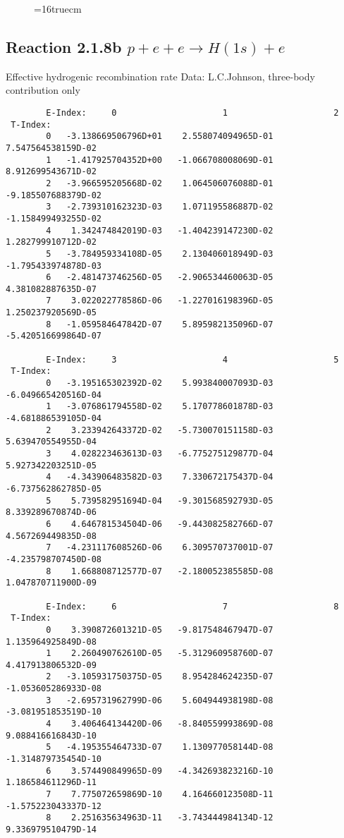 \documentclass[12pt]{article}
\begin{document}
\begin{figure} \label{2.1.8a}
\epsfxsize=16truecm
\end{figure}
\newpage

\subsection{
  Reaction 2.1.8b  $p + e + e \rightarrow H(1s) + e$
}

   Effective hydrogenic recombination rate
   Data: L.C.Johnson, three-body contribution only



\begin{small}\begin{verbatim}
        E-Index:     0                     1                     2
 T-Index:
        0   -3.138669506796D+01    2.558074094965D-01    7.547564538159D-02
        1   -1.417925704352D+00   -1.066708008069D-01    8.912699543671D-02
        2   -3.966595205668D-02    1.064506076088D-01   -9.185507688379D-02
        3   -2.739310162323D-03    1.071195586887D-02   -1.158499493255D-02
        4    1.342474842019D-03   -1.404239147230D-02    1.282799910712D-02
        5   -3.784959334108D-05    2.130406018949D-03   -1.795433974878D-03
        6   -2.481473746256D-05   -2.906534460063D-05    4.381082887635D-07
        7    3.022022778586D-06   -1.227016198396D-05    1.250237920569D-05
        8   -1.059584647842D-07    5.895982135096D-07   -5.420516699864D-07

        E-Index:     3                     4                     5
 T-Index:
        0   -3.195165302392D-02    5.993840007093D-03   -6.049665420516D-04
        1   -3.076861794558D-02    5.170778601878D-03   -4.681886539105D-04
        2    3.233942643372D-02   -5.730070151158D-03    5.639470554955D-04
        3    4.028223463613D-03   -6.775275129877D-04    5.927342203251D-05
        4   -4.343906483582D-03    7.330672175437D-04   -6.737562862785D-05
        5    5.739582951694D-04   -9.301568592793D-05    8.339289670874D-06
        6    4.646781534504D-06   -9.443082582766D-07    4.567269449835D-08
        7   -4.231117608526D-06    6.309570737001D-07   -4.235798707450D-08
        8    1.668808712577D-07   -2.180052385585D-08    1.047870711900D-09

        E-Index:     6                     7                     8
 T-Index:
        0    3.390872601321D-05   -9.817548467947D-07    1.135964925849D-08
        1    2.260490762610D-05   -5.312960958760D-07    4.417913806532D-09
        2   -3.105931750375D-05    8.954284624235D-07   -1.053605286933D-08
        3   -2.695731962799D-06    5.604944938198D-08   -3.081951853519D-10
        4    3.406464134420D-06   -8.840559993869D-08    9.088416616843D-10
        5   -4.195355464733D-07    1.130977058144D-08   -1.314879735454D-10
        6    3.574490849965D-09   -4.342693823216D-10    1.186584611296D-11
        7    7.775072659869D-10    4.164660123508D-11   -1.575223043337D-12
        8    2.251635634963D-11   -3.743444984134D-12    9.336979510479D-14


\end{verbatim}
\end{small}
\end{document}
